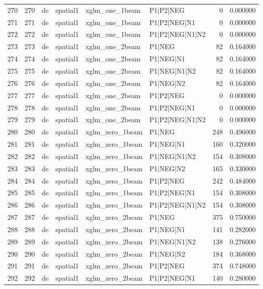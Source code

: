 \begin{tabular}{lrllllrr}
270 & 270 & de & spatial1 & xglm_one_1beam & P1|P2|NEG & 0 & 0.000000 \\
271 & 271 & de & spatial1 & xglm_one_1beam & P1|P2|NEG|N1 & 0 & 0.000000 \\
272 & 272 & de & spatial1 & xglm_one_1beam & P1|P2|NEG|N1|N2 & 0 & 0.000000 \\
273 & 273 & de & spatial1 & xglm_one_2beam & P1|NEG & 82 & 0.164000 \\
274 & 274 & de & spatial1 & xglm_one_2beam & P1|NEG|N1 & 82 & 0.164000 \\
275 & 275 & de & spatial1 & xglm_one_2beam & P1|NEG|N1|N2 & 82 & 0.164000 \\
276 & 276 & de & spatial1 & xglm_one_2beam & P1|NEG|N2 & 82 & 0.164000 \\
277 & 277 & de & spatial1 & xglm_one_2beam & P1|P2|NEG & 0 & 0.000000 \\
278 & 278 & de & spatial1 & xglm_one_2beam & P1|P2|NEG|N1 & 0 & 0.000000 \\
279 & 279 & de & spatial1 & xglm_one_2beam & P1|P2|NEG|N1|N2 & 0 & 0.000000 \\
280 & 280 & de & spatial1 & xglm_zero_1beam & P1|NEG & 248 & 0.496000 \\
281 & 281 & de & spatial1 & xglm_zero_1beam & P1|NEG|N1 & 160 & 0.320000 \\
282 & 282 & de & spatial1 & xglm_zero_1beam & P1|NEG|N1|N2 & 154 & 0.308000 \\
283 & 283 & de & spatial1 & xglm_zero_1beam & P1|NEG|N2 & 165 & 0.330000 \\
284 & 284 & de & spatial1 & xglm_zero_1beam & P1|P2|NEG & 242 & 0.484000 \\
285 & 285 & de & spatial1 & xglm_zero_1beam & P1|P2|NEG|N1 & 154 & 0.308000 \\
286 & 286 & de & spatial1 & xglm_zero_1beam & P1|P2|NEG|N1|N2 & 154 & 0.308000 \\
287 & 287 & de & spatial1 & xglm_zero_2beam & P1|NEG & 375 & 0.750000 \\
288 & 288 & de & spatial1 & xglm_zero_2beam & P1|NEG|N1 & 141 & 0.282000 \\
289 & 289 & de & spatial1 & xglm_zero_2beam & P1|NEG|N1|N2 & 138 & 0.276000 \\
290 & 290 & de & spatial1 & xglm_zero_2beam & P1|NEG|N2 & 184 & 0.368000 \\
291 & 291 & de & spatial1 & xglm_zero_2beam & P1|P2|NEG & 374 & 0.748000 \\
292 & 292 & de & spatial1 & xglm_zero_2beam & P1|P2|NEG|N1 & 140 & 0.280000 \\

\end{tabular}
